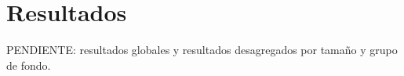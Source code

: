 \section{Resultados}

PENDIENTE: resultados globales y resultados desagregados por tamaño y grupo de
fondo.
